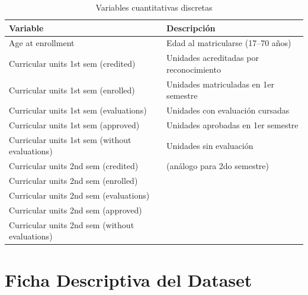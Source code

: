 \documentclass[11pt,a4paper]{article}
\begin{document}
\begin{table}[H]
  \centering
  \begin{tabular}{p{8cm} p{6cm}}
    \toprule
    \textbf{Variable} & \textbf{Descripción} \\
    \midrule
    Age at enrollment                              & Edad al matricularse (17--70 años) \\
    Curricular units 1st sem (credited)            & Unidades acreditadas por reconocimiento \\
    Curricular units 1st sem (enrolled)            & Unidades matriculadas en 1er semestre \\
    Curricular units 1st sem (evaluations)         & Unidades con evaluación cursadas \\
    Curricular units 1st sem (approved)            & Unidades aprobadas en 1er semestre \\
    Curricular units 1st sem (without evaluations) & Unidades sin evaluación \\
    Curricular units 2nd sem (credited)            & (análogo para 2do semestre) \\
    Curricular units 2nd sem (enrolled)            & \\
    Curricular units 2nd sem (evaluations)         & \\
    Curricular units 2nd sem (approved)            & \\
    Curricular units 2nd sem (without evaluations) & \\
    \bottomrule
  \end{tabular}
  \caption{Variables cuantitativas discretas}
\end{table}

\section{Ficha Descriptiva del Dataset}
\end{document}

